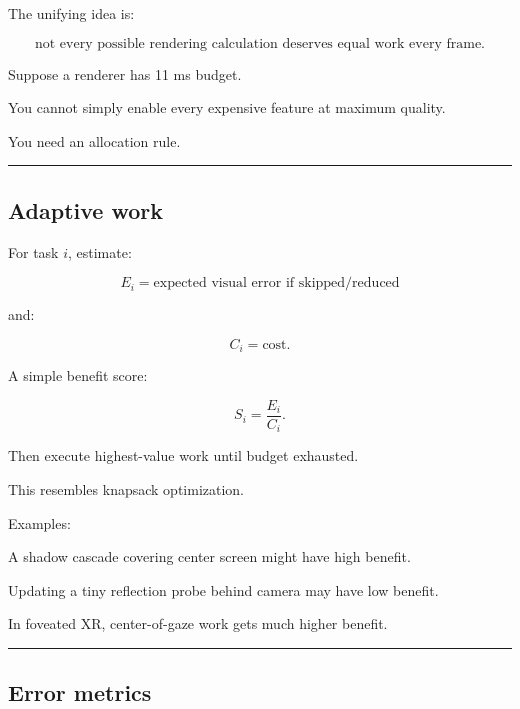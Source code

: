 \hypertarget{04-visual-computing-ii-ch040-adaptive-work-hysteresis-and-hi-z}{}

The unifying idea is:

\[
\boxed{
\text{not every possible rendering calculation deserves equal work every frame}.
}
\]

Suppose a renderer has 11 ms budget.

You cannot simply enable every expensive feature at maximum quality.

You need an allocation rule.

\begin{center}\rule{0.5\linewidth}{0.5pt}\end{center}

\subsection{Adaptive work}\label{04-visual-computing-ii-ch040-adaptive-work}

\hypertarget{04-visual-computing-ii-ch040-adaptive-work}{}

For task \(i\), estimate:

\[
E_i=
\text{expected visual error if skipped/reduced}
\]

and:

\[
C_i=
\text{cost}.
\]

A simple benefit score:

\[
\boxed{
S_i=
\frac{E_i}{C_i}.
}
\]

Then execute highest-value work until budget exhausted.

This resembles knapsack optimization.

Examples:

A shadow cascade covering center screen might have high benefit.

Updating a tiny reflection probe behind camera may have low benefit.

In foveated XR, center-of-gaze work gets much higher benefit.

\begin{center}\rule{0.5\linewidth}{0.5pt}\end{center}

\subsection{Error metrics}\label{04-visual-computing-ii-ch040-error-metrics}

\hypertarget{04-visual-computing-ii-ch040-error-metrics}{}

